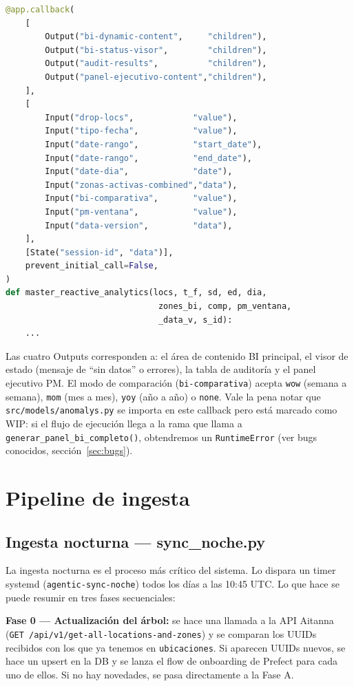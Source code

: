 \documentclass[12pt, a4paper]{article}
\begin{document}
\begin{lstlisting}[language=Python]
@app.callback(
    [
        Output("bi-dynamic-content",     "children"),
        Output("bi-status-visor",        "children"),
        Output("audit-results",          "children"),
        Output("panel-ejecutivo-content","children"),
    ],
    [
        Input("drop-locs",            "value"),
        Input("tipo-fecha",           "value"),
        Input("date-rango",           "start_date"),
        Input("date-rango",           "end_date"),
        Input("date-dia",             "date"),
        Input("zonas-activas-combined","data"),
        Input("bi-comparativa",       "value"),
        Input("pm-ventana",           "value"),
        Input("data-version",         "data"),
    ],
    [State("session-id", "data")],
    prevent_initial_call=False,
)
def master_reactive_analytics(locs, t_f, sd, ed, dia,
                               zones_bi, comp, pm_ventana,
                               _data_v, s_id):
    ...
\end{lstlisting}

Las cuatro Outputs corresponden a: el área de contenido BI principal, el visor de estado (mensaje de ``sin datos'' o errores), la tabla de auditoría y el panel ejecutivo PM. El modo de comparación (\texttt{bi-comparativa}) acepta \texttt{wow} (semana a semana), \texttt{mom} (mes a mes), \texttt{yoy} (año a año) o \texttt{none}. Vale la pena notar que \texttt{src/models/anomalys.py} se importa en este callback pero está marcado como WIP: si el flujo de ejecución llega a la rama que llama a \texttt{generar\_panel\_bi\_completo()}, obtendremos un \texttt{RuntimeError} (ver bugs conocidos, sección~\ref{sec:bugs}).

\section{Pipeline de ingesta}

\subsection{Ingesta nocturna — sync\_noche.py}

La ingesta nocturna es el proceso más crítico del sistema. Lo dispara un timer systemd (\texttt{agentic-sync-noche}) todos los días a las 10:45 UTC. Lo que hace se puede resumir en tres fases secuenciales:

\textbf{Fase 0 — Actualización del árbol:} se hace una llamada a la API Aitanna (\texttt{GET /api/v1/get-all-locations-and-zones}) y se comparan los UUIDs recibidos con los que ya tenemos en \texttt{ubicaciones}. Si aparecen UUIDs nuevos, se hace un upsert en la DB y se lanza el flow de onboarding de Prefect para cada uno de ellos. Si no hay novedades, se pasa directamente a la Fase A.
\end{document}
